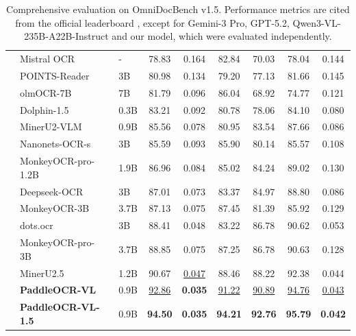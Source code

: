 \documentclass[11pt, a4paper,logo,  copyright, nonumbering]{paddleocr}
\begin{document}
\begin{table}[!t]
{\begin{tabular}{l|ll|c|c c c c c}
        & Mistral OCR~\cite{mistral} & - & 78.83 & 0.164 & 82.84 & 70.03 & 78.04 & 0.144 \\
        & POINTS-Reader~\cite{liu2025points} & 3B & 80.98 & 0.134 & 79.20 & 77.13 & 81.66 & 0.145 \\
        & olmOCR-7B~\cite{poznanski2025olmocr} & 7B & 81.79 & 0.096 & 86.04 & 68.92 & 74.77 & 0.121 \\
        & Dolphin-1.5 ~\cite{feng2025dolphin} & 0.3B & 83.21 & 0.092 & 80.78 & 78.06 & 84.10 & 0.080 \\
        & MinerU2-VLM~\cite{MinerU2} & 0.9B & 85.56 & 0.078 & 80.95 & 83.54 & 87.66 & 0.086 \\
        & Nanonets-OCR-s~\cite{Nanonets-OCR-S} & 3B & 85.59 & 0.093 & 85.90 & 80.14 & 85.57 & 0.108 \\
           & MonkeyOCR-pro-1.2B~\cite{li2025monkeyocr} & 1.9B & 86.96 & 0.084 & 85.02 & 84.24 & 89.02 & 0.130 \\
        & Deepseek-OCR~\cite{wei2025deepseek} & 3B & 87.01 & 0.073 & 83.37 & 84.97 & 88.80 & 0.086 \\
        & MonkeyOCR-3B~\cite{li2025monkeyocr} & 3.7B & 87.13 & 0.075 & 87.45 & 81.39 & 85.92 & 0.129 \\
        & dots.ocr~\cite{dotsocr} & 3B & 88.41 & 0.048 & 83.22 & 86.78 & 90.62 & 0.053 \\
      & MonkeyOCR-pro-3B~\cite{li2025monkeyocr} & 3.7B & 88.85 & 0.075 & 87.25 & 86.78 & 90.63 & 0.128 \\
        & MinerU2.5~\cite{niu2025mineru2} & 1.2B & 90.67 & \cellcolor{cyan!15}\underline{0.047} & 88.46 & 88.22 & 92.38 & 0.044 \\ 

        & \textbf{PaddleOCR-VL~\cite{cui2025paddleocrvl}} & 0.9B &\cellcolor{cyan!15}\underline{92.86} & \cellcolor{red!15}\textbf{0.035} & \cellcolor{cyan!15}\underline{91.22} & \cellcolor{cyan!15}\underline{90.89} &\cellcolor{cyan!15}\underline{94.76} & \cellcolor{cyan!15}\underline{0.043} \\
        
        & \textbf{PaddleOCR-VL-1.5} & 0.9B & \cellcolor{red!15}\textbf{94.50} & \cellcolor{red!15}\textbf{0.035} & \cellcolor{red!15}\textbf{94.21} & \cellcolor{red!15}\textbf{92.76} & \cellcolor{red!15}\textbf{95.79} & \cellcolor{red!15}\textbf{0.042} \\
        \bottomrule
    \end{tabular}%
    }
   \caption{Comprehensive evaluation on OmniDocBench v1.5. Performance metrics are cited from the official leaderboard \cite{ouyang2025omnidocbench}, except for Gemini-3 Pro, GPT-5.2, Qwen3-VL-235B-A22B-Instruct and our model, which were evaluated independently.}
       \label{tab:omni15_performance}
\end{table}
\end{document}
